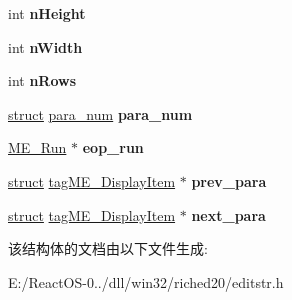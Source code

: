 \begin{DoxyCompactItemize}
int {\bfseries n\+Height}
\item 
\mbox{\label{structtag_m_e___paragraph_ab7950d19351ab0fce12b2f54408e9e8e}} 
int {\bfseries n\+Width}
\item 
\mbox{\label{structtag_m_e___paragraph_ae2e8e8992985b859fb26ac40e5071ce3}} 
int {\bfseries n\+Rows}
\item 
\mbox{\label{structtag_m_e___paragraph_a2d6d0029c4b95ed771a6dd806e3bd2cb}} 
\hyperlink{interfacestruct}{struct} \hyperlink{structpara__num}{para\+\_\+num} {\bfseries para\+\_\+num}
\item 
\mbox{\label{structtag_m_e___paragraph_afc0e3a1572888d0ea95777c3ed495d1e}} 
\hyperlink{structtag_m_e___run}{M\+E\+\_\+\+Run} $\ast$ {\bfseries eop\+\_\+run}
\item 
\mbox{\label{structtag_m_e___paragraph_a74c5dc637fe01f2035cecc9c0eeb0586}} 
\hyperlink{interfacestruct}{struct} \hyperlink{structtag_m_e___display_item}{tag\+M\+E\+\_\+\+Display\+Item} $\ast$ {\bfseries prev\+\_\+para}
\item 
\mbox{\label{structtag_m_e___paragraph_a23cc29214098a1644e1847c521e2ff83}} 
\hyperlink{interfacestruct}{struct} \hyperlink{structtag_m_e___display_item}{tag\+M\+E\+\_\+\+Display\+Item} $\ast$ {\bfseries next\+\_\+para}
\end{DoxyCompactItemize}


该结构体的文档由以下文件生成\+:\begin{DoxyCompactItemize}
\item 
E\+:/\+React\+O\+S-\/0../dll/win32/riched20/editstr.\+h\end{DoxyCompactItemize}

